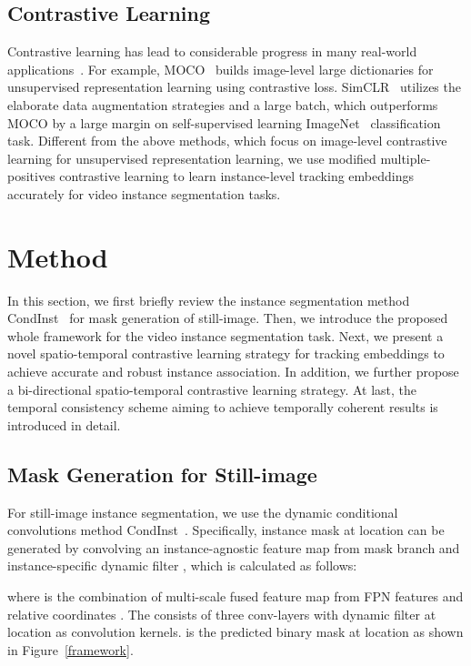 \documentclass[runningheads]{llncs}
\begin{document}
\subsection{Contrastive Learning}
Contrastive learning has lead to considerable progress in many real-world applications~\cite{he2020momentum,chen2020simple,tian2020makes,xiong2020loco,pang2021quasi,kalantidis2020hard,chen2020improved}. For example, MOCO~\cite{he2020momentum} builds image-level large dictionaries for unsupervised representation learning using contrastive loss. SimCLR~\cite{chen2020simple} utilizes the elaborate data augmentation strategies and a large batch, which outperforms MOCO by a large margin on self-supervised learning ImageNet~\cite{russakovsky2015imagenet} classification task. Different from the above methods, which focus on image-level contrastive learning for unsupervised representation learning, we use modified multiple-positives contrastive learning to learn instance-level tracking embeddings accurately for video instance segmentation tasks.  \section{Method}
In this section, we first briefly review the instance segmentation method CondInst~\cite{tian2020conditional} for mask generation of still-image. Then, we introduce the proposed whole framework for the video instance segmentation task. Next, we present a novel spatio-temporal contrastive learning strategy for tracking embeddings to achieve accurate and robust instance association. In addition, we further propose a bi-directional spatio-temporal contrastive learning strategy. At last, the temporal consistency scheme aiming to achieve temporally coherent results is introduced in detail. 

\subsection{Mask Generation for Still-image}
For still-image instance segmentation, we use the dynamic conditional convolutions method CondInst~\cite{tian2020conditional,jia2016dynamic}. Specifically, instance mask at location  can be generated by convolving an instance-agnostic feature map  from mask branch and instance-specific dynamic filter , which is calculated as follows:

where  is the combination of multi-scale fused feature map  from FPN features  and relative coordinates . The  consists of three  conv-layers with dynamic filter  at location  as convolution kernels.  is the predicted binary mask at location  as shown in Figure~\ref{framework}.
\end{document}
